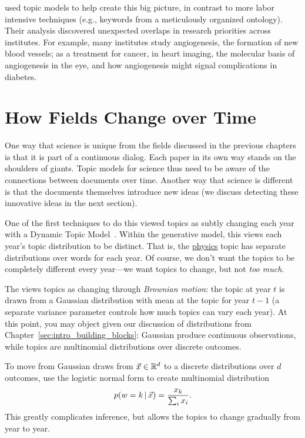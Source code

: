 \citet{talley-11} used topic models to help create this big picture,
in contrast to more labor intensive techniques (e.g., keywords from a
meticulously organized ontology).  Their analysis discovered
unexpected overlaps in research priorities across institutes.  For
example, many institutes study angiogenesis, the formation of new
blood vessels; as a treatment for cancer, in heart imaging, the
molecular basis of angiogenesis in the eye, and how angiogenesis might
signal complications in diabetes.

\section{How Fields Change over Time}
\label{sec:sci_change}

One way that science is unique from the fields discussed in the
previous chapters is that it is part of a continuous dialog.  Each
paper in its own way stands on the shoulders of giants. Topic models
for science thus need to be aware of the connections between documents
over time.  Another way that science is different is that the
documents themselves introduce new ideas (we discuss detecting these
innovative ideas in the next section).

One of the first techniques to do this viewed topics as subtly
changing each year with a Dynamic Topic Model~\citep[]{blei-06b}.  Within the generative model,
this views each year's topic distribution to be distinct.  That is,
the \underline{physics} topic has separate distributions over words
for each year.  Of course, we don't want the topics to be completely
different every year---we want topics to change, but not \emph{too
  much}.

The  views topics as changing through \emph{Brownian
  motion}: the topic at year $t$ is drawn from a Gaussian distribution
with mean at the topic for year $t-1$ (a separate variance parameter
controls how much topics can vary each year).  At this point, you may
object given our discussion of distributions from
Chapter~\ref{sec:intro_building_blocks}: Gaussian produce continuous
observations, while topics are multinomial distributions over discrete
outcomes.

To move from Gaussian draws from $\vec x \in \mathbb{R}^d$ to a discrete distributions
over $d$ outcomes, \citet{blei-06b} use the logistic normal form to
create multinomial distribution
\begin{equation}
p(w=k \, | \, \vec x)  = \frac{x_k}{\sum_i x_i}.
\end{equation}
This greatly complicates inference, but allows the topics to change
gradually from year to year.

